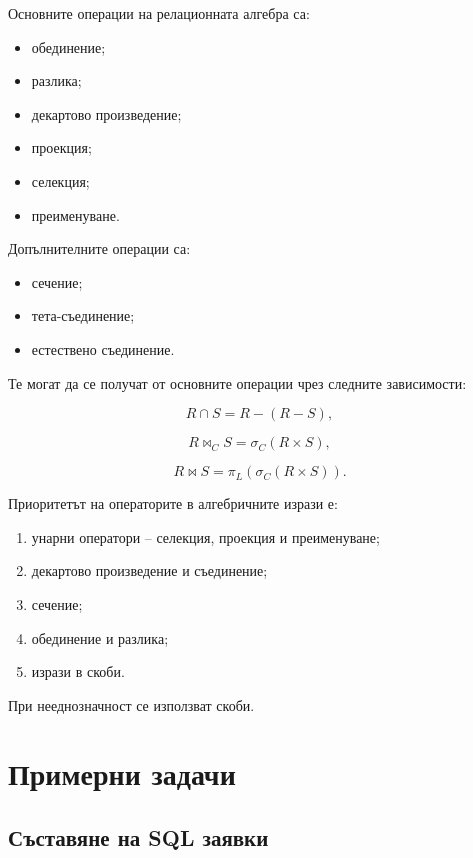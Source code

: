 Основните операции на релационната алгебра са:

\begin{itemize}
    \item обединение;
    \item разлика;
    \item декартово произведение;
    \item проекция;
    \item селекция;
    \item преименуване.
\end{itemize}

Допълнителните операции са:

\begin{itemize}
    \item сечение;
    \item тета-съединение;
    \item естествено съединение.
\end{itemize}

Те могат да се получат от основните операции чрез следните зависимости:

\[
R\cap S=R-(R-S),
\]

\[
R\bowtie_C S=\sigma_C(R\times S),
\]

\[
R\bowtie S=\pi_L\left(\sigma_C(R\times S)\right).
\]

Приоритетът на операторите в алгебричните изрази е:

\begin{enumerate}
    \item унарни оператори -- селекция, проекция и преименуване;
    \item декартово произведение и съединение;
    \item сечение;
    \item обединение и разлика;
    \item изрази в скоби.
\end{enumerate}

При нееднозначност се използват скоби.

\section{Примерни задачи}\label{s:23.5}

\subsection{Съставяне на SQL заявки}\label{s:23.5.1}

